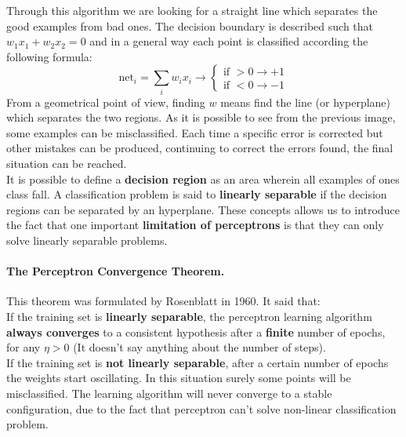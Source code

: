 Through this algorithm we are looking for a straight line which separates the good examples from bad ones. The decision boundary is described such that $w_1x_1 + w_2x_2 = 0$ and in a general way each point is classified according the following formula:
$$\text{net}_i = \sum_i w_ix_i \rightarrow \begin{cases}
\text{if } >0 \rightarrow +1\\
\text{if } <0 \rightarrow -1
\end{cases}$$
From a geometrical point of view, finding $w$ means find the line (or hyperplane) which separates the two regions.
As it is possible to see from the previous image, some examples can be misclassified. Each time a specific error is corrected but other mistakes can be produced, continuing to correct the errors found, the final situation can be reached.\\
It is possible to define a \textbf{decision region} as an area wherein all examples of ones class fall. A classification problem is said to \textbf{linearly separable} if the decision regions can be separated by an hyperplane. These concepts allows us to introduce the fact that one important \textbf{limitation of perceptrons} is that they can only solve linearly separable problems.

\paragraph*{The Perceptron Convergence Theorem.} This theorem was formulated by Rosenblatt in 1960. It said that:\\
If the training set is \textbf{linearly separable}, the perceptron learning algorithm \textbf{always converges} to a consistent hypothesis after a \textbf{finite} number of epochs, for any $\eta > 0$ (It doesn't say anything about the number of steps).\\
If the training set is \textbf{not linearly separable}, after a certain number of epochs the weights start oscillating. In this situation surely some points will be misclassified. The learning algorithm will never converge to a stable configuration, due to the fact that perceptron can't solve non-linear classification problem.

\par \bigskip \noindent
